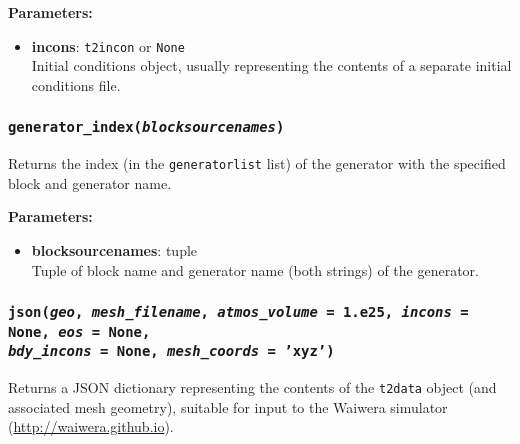 \textbf{Parameters:}
\begin{itemize}
\item \textbf{incons}: \texttt{t2incon} or \texttt{None}\\
  Initial conditions object, usually representing the contents of a separate initial conditions file.
\end{itemize}

\begin{snugshade}
\subsubsection{\texttt{generator\_index(\emph{blocksourcenames})}}
\end{snugshade}
\label{sec:t2data:generator_index}

Returns the index (in the \texttt{generatorlist} list) of the generator with the specified block and generator name.

\textbf{Parameters:}
\begin{itemize}
\item \textbf{blocksourcenames}: tuple\\
  Tuple of block name and generator name (both strings) of the generator.
\end{itemize}

\begin{snugshade}
  \subsubsection{\texttt{json(\emph{geo}, \emph{mesh\_filename}, \emph{atmos\_volume} = 1.e25,
      \emph{incons} = \texttt{None}, \emph{eos} = \texttt{None}, \\
      \emph{bdy\_incons} = \texttt{None}, \emph{mesh\_coords} = 'xyz')}}
\end{snugshade}
\label{sec:t2data:json}

Returns a JSON dictionary representing the contents of the \texttt{t2data} object (and associated
mesh geometry), suitable for input to the Waiwera simulator (\url{http://waiwera.github.io}).

